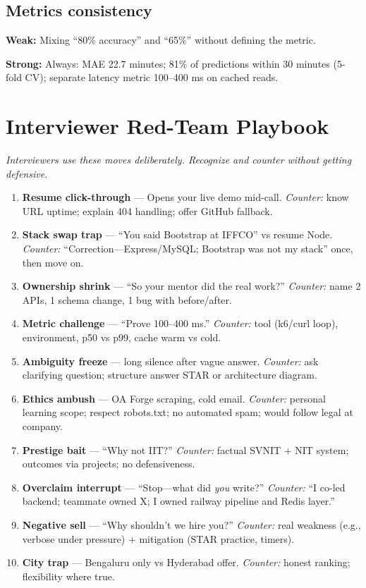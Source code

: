 \documentclass[9pt,a4paper]{article}
\newcommand{\goodans}[1]{\par\noindent\textbf{\textcolor{green!50!black}{Strong:}} #1\par\vspace{1mm}}
\newcommand{\badans}[1]{\par\noindent\textbf{\textcolor{red!70!black}{Weak:}} #1\par\vspace{1mm}}
\begin{document}
\subsection{Metrics consistency}
\badans{Mixing ``80\% accuracy'' and ``65\%'' without defining the metric.}
\goodans{Always: MAE 22.7 minutes; 81\% of predictions within 30 minutes (5-fold CV); separate latency metric 100--400 ms on cached reads.}

\newpage
\section{Interviewer Red-Team Playbook}
\textit{Interviewers use these moves deliberately. Recognize and counter without getting defensive.}

\begin{enumerate}
  \item \textbf{Resume click-through} --- Opens your live demo mid-call. \textit{Counter:} know URL uptime; explain 404 handling; offer GitHub fallback.
  \item \textbf{Stack swap trap} --- ``You said Bootstrap at IFFCO'' vs resume Node. \textit{Counter:} ``Correction---Express/MySQL; Bootstrap was not my stack'' once, then move on.
  \item \textbf{Ownership shrink} --- ``So your mentor did the real work?'' \textit{Counter:} name 2 APIs, 1 schema change, 1 bug with before/after.
  \item \textbf{Metric challenge} --- ``Prove 100--400 ms.'' \textit{Counter:} tool (k6/curl loop), environment, p50 vs p99, cache warm vs cold.
  \item \textbf{Ambiguity freeze} --- long silence after vague answer. \textit{Counter:} ask clarifying question; structure answer STAR or architecture diagram.
  \item \textbf{Ethics ambush} --- OA Forge scraping, cold email. \textit{Counter:} personal learning scope; respect robots.txt; no automated spam; would follow legal at company.
  \item \textbf{Prestige bait} --- ``Why not IIT?'' \textit{Counter:} factual SVNIT + NIT system; outcomes via projects; no defensiveness.
  \item \textbf{Overclaim interrupt} --- ``Stop---what did \emph{you} write?'' \textit{Counter:} ``I co-led backend; teammate owned X; I owned railway pipeline and Redis layer.''
  \item \textbf{Negative sell} --- ``Why shouldn't we hire you?'' \textit{Counter:} real weakness (e.g., verbose under pressure) + mitigation (STAR practice, timers).
  \item \textbf{City trap} --- Bengaluru only vs Hyderabad offer. \textit{Counter:} honest ranking; flexibility where true.
\end{enumerate}
\end{document}
